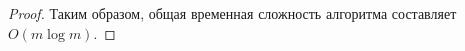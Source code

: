 \begin{proof}
\vskip 0.1in
Таким образом, общая временная сложность алгоритма составляет $O(m \log m)$.
\end{proof}
\vskip 0.6in

\begin{comment}
To find the number of strongly connected components, we can use Kosaraju's algorithm or Tarjan's algorithm, both of which have a time complexity of $O(n + m)$ in the worst case. However, we can optimize this to $O(m \log m)$ in the case where the input graph is a path graph with additional random edges.
\vskip 0.1in
First, observe that the input graph has at most $n$ strongly connected components, since the path graph itself has $n$ strongly connected components, and the additional edges can only merge these components together.
\vskip 0.1in
Let us consider a slightly modified version of the input graph, which we obtain by reversing all the edges in the original graph. This modified graph has the same strongly connected components as the original graph, but all the edges are now directed from higher-numbered vertices to lower-numbered vertices.
\vskip 0.1in
Now, let us run Kosaraju's algorithm on the modified graph. The algorithm first performs a depth-first search on the graph to determine the order in which the vertices should be processed, and then performs a second depth-first search in reverse order to identify the strongly connected components.
\vskip 0.1in
In our case, the order in which the vertices should be processed is simply in decreasing order of their vertex numbers. This can be obtained in $O(n)$ time by sorting the vertices. Furthermore, each additional edge that was added to the original path graph can only affect the strongly connected components that contain the endpoints of the edge. Therefore, we can sort the additional edges by their endpoints, and process them in order. For each additional edge $(u,v)$, we remove it from the modified graph, and add it back in the original orientation if it creates a cycle. We can detect whether an edge creates a cycle by checking whether $u$ and $v$ are already in the same strongly connected component. This can be done efficiently using a union-find data structure, which supports union and find operations in $O(\log m)$ time. The total time complexity of processing all the additional edges in this way is $O(m \log m)$.
\vskip 0.1in
After all the additional edges have been processed, we can run the second depth-first search in reverse order of the vertex numbers, as usual, to identify the strongly connected components. The total time complexity of this step is $O(n + m) = O(m)$.
\vskip 0.1in
Therefore, the overall time complexity of the algorithm is $O(m \log m)$.
\end{comment}



